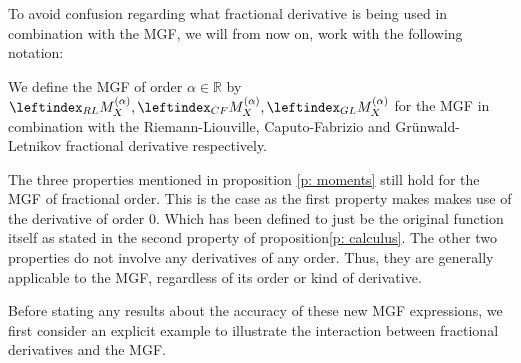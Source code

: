 To avoid confusion regarding what fractional derivative is being used in combination with the MGF, we will from now on, work with the following notation:
\begin{definition}\label{d: MGF}
    We define the MGF of order \(\alpha \in \mathbb{R}\) by \(\leftindex_{RL}{M}_X^{(\alpha)}, \leftindex_{CF}{M}_X^{(\alpha)}, \leftindex_{GL}{M}_X^{(\alpha)}\) for the MGF in combination with the Riemann-Liouville, Caputo-Fabrizio and Grünwald-Letnikov fractional derivative respectively.
\end{definition}
\begin{remark}
    The three properties mentioned in proposition \ref{p: moments} still hold for the MGF of fractional order. This is the case as the first property makes makes use of the derivative of order 0. Which has been defined to just be the original function itself as stated in the second property of proposition\ref{p: calculus}. The other two properties do not involve any derivatives of any order. Thus, they are generally applicable to the MGF, regardless of its order or kind of derivative.
\end{remark}

Before stating any results about the accuracy of these new MGF expressions, we first consider an explicit example to illustrate the interaction between fractional derivatives and the MGF. 

